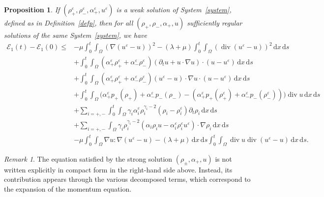 \documentclass[11pt, twoside, a4paper]{article}
\theoremstyle{plain}
\newtheorem{proposition}[theorem]{Proposition}
\theoremstyle{remark}
\newtheorem{remark}[theorem]{Remark}
\numberwithin{equation}{section}
\def\EE{{\mathcal E}}
\newcommand{\dd}{\,\mathrm{d}}
\renewcommand{\div}{\operatorname{div}}
\renewcommand{\leq}{\leqslant}\renewcommand{\le}{\leqslant}
\renewcommand{\epsilon}{\varepsilon}
\newcommand{\eps}{\varepsilon}
\begin{document}
\begin{appendices}
\begin{proposition}\label{prop1app} If $(\rho^{\epsilon}_+,\rho^{\epsilon}_-,\alpha^{\epsilon}_+,u^{\epsilon})$ is a weak solution of System~\eqref{system}, defined as in Definition~\ref{defp}, then for all $(\rho_+,\rho_-,\alpha_+,u)$ sufficiently regular solutions of the same System~\eqref{system}, we have
 \begin{align*}
 \EE_1(t) - \EE_1(0) \leq& - \mu \int_0^t\!\!\! \int_{\Omega} \left( \nabla (u^{\epsilon}-u) \right)^2 - (\lambda+\mu) \int_0^t\!\!\! \int_{\Omega} \left( \div (u^{\epsilon}-u) \right)^2 \dd x \dd s \\
 &+ \int_0^t\!\!\! \int_{\Omega} \left(\alpha_+^{\varepsilon} \rho_{+}^{\varepsilon}+\alpha_-^{\varepsilon} \rho_-^{\epsilon}\right) (\partial_t u + u \cdot \nabla u)\cdot (u-u^{\epsilon}) \dd x \dd s \\
 &+ \int_0^t\!\!\! \int_{\Omega} \left(\alpha_+^{\varepsilon} \rho_{+}^{\varepsilon}+\alpha_-^{\varepsilon} \rho_-^{\epsilon}\right) (u^{\epsilon}-u)\cdot \nabla u \cdot (u-u^{\epsilon}) \dd x \dd s \\
 &+\int_0^t\!\!\! \int_{\Omega} \Big(\alpha_+^\eps p_+(\rho_+) + \alpha_-^\eps p_-(\rho_-) - \left(\alpha_+^{\varepsilon} p_+\left(\rho_{+}^{\varepsilon}\right)+\alpha_-^{\varepsilon} p_-\left(\rho_-^{\varepsilon}\right)\right) \Big) \div u \dd x \dd s \\
 &+ \sum_{i=+,-} \int_0^t\!\!\! \int_{\Omega} \gamma_i \alpha_i^{\epsilon} \rho_i^{\gamma_i-2}(\rho_i - \rho_i^{\epsilon})\partial_t \rho_i \dd x \dd s\\
 &+ \sum_{i=+,-} \int_{\Omega} \gamma_i \rho_i^{\gamma_i-2} (\alpha_i\rho_iu-\alpha_i^{\epsilon} \rho_i^{\epsilon} u^{\epsilon}) \cdot \nabla\rho_i \dd x \dd s \\
 &-\mu \int_0^t\!\!\! \int_{\Omega} \nabla u : \nabla(u^\eps-u) - (\lambda+\mu) \dd x\dd s \int_0^t\!\!\! \int_{\Omega} \div u \div(u^\eps-u) \dd x\dd s.
 \end{align*}
\end{proposition} 

\begin{remark}
The equation satisfied by the strong solution $(\rho_\pm, \alpha_+,u)$ is not written explicitly in compact form in the right-hand side above. Instead, its contribution appears through the various decomposed terms, which correspond to the expansion of the momentum equation.
\end{remark}


\end{appendices}
\end{document}
